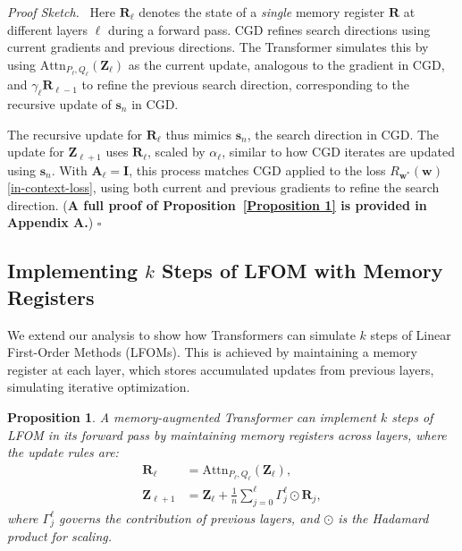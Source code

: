 \documentclass[11pt]{article}
\numberwithin{equation}{section}
\newtheorem{proposition}{Proposition}
\newenvironment{proofsketch}{\par\noindent\textit{Proof Sketch.}\ }{\hfill$\square$\par}
\begin{document}
\begin{proofsketch}
Here \(\mathbf{R}_{\ell}\) denotes the state of a \textit{single} memory register \(\mathbf R\) at different layers \(\ell\) during a forward pass. CGD refines search directions using current gradients and previous directions. The Transformer simulates this by using \( \mathrm{Attn}_{P_\ell, Q_\ell}(\mathbf{Z}_\ell) \) as the current update, analogous to the gradient in CGD, and \( \gamma_\ell \mathbf{R}_{\ell-1} \) to refine the previous search direction, corresponding to the recursive update of \( \mathbf{s}_n \) in CGD.

The recursive update for \( \mathbf{R}_\ell \) thus mimics \( \mathbf{s}_n \), the search direction in CGD. The update for \( \mathbf{Z}_{\ell+1} \) uses \( \mathbf{R}_\ell \), scaled by \( \alpha_\ell \), similar to how CGD iterates are updated using \( \mathbf{s}_n \). With \( \mathbf{A}_\ell = \mathbf{I} \), this process matches CGD applied to the loss \( R_{\mathbf{w}^*}(\mathbf{w}) \) \eqref{in-context-loss}, using both current and previous gradients to refine the search direction. (\textbf{A full proof of Proposition~\ref{Proposition 1} is provided in Appendix A.})
\end{proofsketch}

\subsection{Implementing \texorpdfstring{$k$}{k} Steps of LFOM with Memory Registers}
\label{Sec:LFOM-mem}

We extend our analysis to show how Transformers can simulate \( k \) steps of Linear First-Order Methods (LFOMs). This is achieved by maintaining a memory register at each layer, which stores accumulated updates from previous layers, simulating iterative optimization.

\begin{proposition}\label{Proposition 2}
A memory-augmented Transformer can implement \( k \) steps of LFOM in its forward pass by maintaining memory registers across layers, where the update rules are:
\begin{align}
    \mathbf{R}_\ell &= \mathrm{Attn}_{P_\ell, Q_\ell}(\mathbf{Z}_\ell), \\
    \mathbf{Z}_{\ell+1} &= \mathbf{Z}_\ell + \frac{1}{n} \sum_{j=0}^{\ell} \Gamma_j^\ell \odot \mathbf{R}_j, \label{LFOM_memory}
\end{align}
where \( \Gamma_j^\ell \) governs the contribution of previous layers, and \( \odot \) is the Hadamard product for scaling.
\end{proposition}
\end{document}
